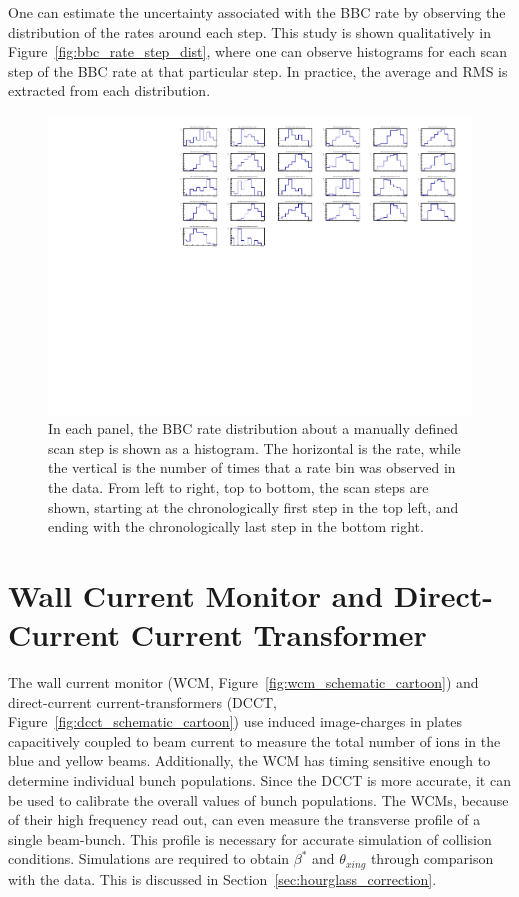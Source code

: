 One can estimate the uncertainty associated with the BBC rate by observing the
distribution of the rates around each step. This study is shown qualitatively in
Figure~\ref{fig:bbc_rate_step_dist}, where one can observe histograms for each
scan step of the BBC rate at that particular step. In practice, the average and
RMS is extracted from each distribution.

\begin{figure}
  \centering
  \includegraphics[width=\linewidth]{./figures/359711_bbc_rate_distribution_per_step.pdf}
  \caption{
    In each panel, the BBC rate distribution about a manually defined scan step
    is shown as a histogram. The horizontal is the rate, while the vertical is
    the number of times that a rate bin was observed in the data. From left to
    right, top to bottom, the scan steps are shown, starting at the
    chronologically first step in the top left, and ending with the
    chronologically last step in the bottom right.
  }

\end{figure}

\clearpage
\section{Wall Current Monitor and Direct-Current Current Transformer}

The wall current monitor (WCM, Figure~\ref{fig:wcm_schematic_cartoon}) and
direct-current current-transformers (DCCT,
Figure~\ref{fig:dcct_schematic_cartoon}) use induced image-charges in plates
capacitively coupled to beam current to measure the total number of ions in the
blue and yellow beams. Additionally, the WCM has timing sensitive enough to
determine individual bunch populations. Since the DCCT is more accurate, it can
be used to calibrate the overall values of bunch populations. The WCMs, because
of their high frequency read out, can even measure the transverse profile of a
single beam-bunch. This profile is necessary for accurate simulation of
collision conditions. Simulations are required to obtain $\beta^*$ and
$\theta_{xing}$ through comparison with the data. This is discussed in
Section~\ref{sec:hourglass_correction}.

